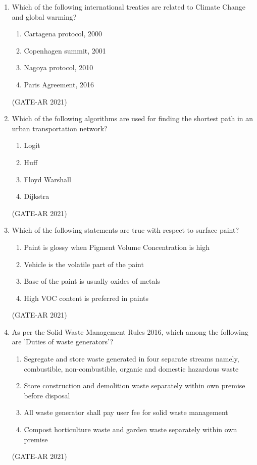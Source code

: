\documentclass[a4paper,10pt]{article}
\begin{document}
\begin{enumerate}
    \item Which of the following international treaties are related to Climate Change and global warming?
    \begin{multicols}{2}
    \begin{enumerate}
    \item Cartagena protocol, 2000
    \item Copenhagen summit, 2001
    \item Nagoya protocol, 2010
    \item Paris Agreement, 2016
    \end{enumerate}
    \end{multicols}
    \hfill (GATE-AR 2021)

    \item Which of the following algorithms are used for finding the shortest path in an urban transportation network?
    \begin{multicols}{4}
    \begin{enumerate}
    \item Logit
    \item Huff
    \item Floyd Warshall
    \item Dijkstra
    \end{enumerate}
    \end{multicols}
    \hfill (GATE-AR 2021)

    \item Which of the following statements are true with respect to surface paint?
    \begin{enumerate}
    \item Paint is glossy when Pigment Volume Concentration is high
    \item Vehicle is the volatile part of the paint
    \item Base of the paint is usually oxides of metals
    \item High VOC content is preferred in paints
    \end{enumerate}
    \hfill (GATE-AR 2021)

    \item As per the Solid Waste Management Rules 2016, which among the following are 'Duties of waste generators'?
    \begin{enumerate}
    \item Segregate and store waste generated in four separate streams namely, combustible, non-combustible, organic and domestic hazardous waste
    \item Store construction and demolition waste separately within own premise before disposal
    \item All waste generator shall pay user fee for solid waste management
    \item Compost horticulture waste and garden waste separately within own premise
    \end{enumerate}
    \hfill (GATE-AR 2021)


\end{enumerate}
\end{document}
